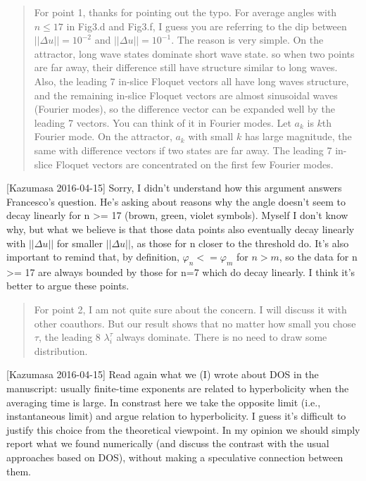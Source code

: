 \begin{description}
\begin{quotation}
  For point 1, thanks for pointing out the typo. For average angles
  with $n \le 17$ in Fig3.d and Fig3.f, I guess you are referring
  to the dip between $||\Delta u|| = 10^{-2}$ and $||\Delta u|| = 10^{-1}$.
  The reason is very simple. On the attractor, long wave states dominate
  short wave state. so when two points are far away, their difference
  still have structure similar to long waves. Also, the leading
  7 in-slice Floquet vectors all have long waves structure, and the
  remaining in-slice Floquet vectors are almost sinusoidal waves
  (Fourier modes), so the difference vector can be expanded well
  by the leading 7 vectors. You can think of it in Fourier modes.
  Let $a_k$ is $k$th Fourier mode. On the attractor, $a_k$ with small
  $k$ has large magnitude, the same with difference vectors if two states
  are far away. The leading 7 in-slice Floquet vectors are concentrated
  on the first few Fourier modes.
\end{quotation}
[Kazumasa 2016-04-15]
Sorry, I didn't understand how this argument answers Francesco's
question. He's asking about reasons why the angle doesn't seem to decay
linearly for n >= 17 (brown, green, violet symbols). Myself I don't know
why, but what we believe is that those data points also eventually decay
linearly with $||\Delta u||$ for smaller $||\Delta u||$, as those for n
closer to the threshold do. It's also important to remind that, by
definition, $\varphi_n <= \varphi_m$ for $n>m$, so the data for n >= 17 are
always bounded by those for n=7 which do decay linearly. I think it's
better to argue these points.


\begin{quotation}
  For point 2, I am not quite sure about the concern. I will discuss it with
  other coauthors. But our result shows that no matter how small you chose $\tau$,
  the leading 8 $\lambda_i^\tau$ always dominate. There is no need to draw
  some distribution.
\end{quotation}
[Kazumasa 2016-04-15]
Read again what we (I) wrote about DOS in the manuscript: usually
finite-time exponents are related to hyperbolicity when the averaging
time is large. In constrast here we take the opposite limit (i.e.,
instantaneous limit) and argue relation to hyperbolicity. I guess it's
difficult to justify this choice from the theoretical viewpoint. In my
opinion we should simply report what we found numerically (and discuss
the contrast with the usual approaches based on DOS), without making a
speculative connection between them.


\end{description}
